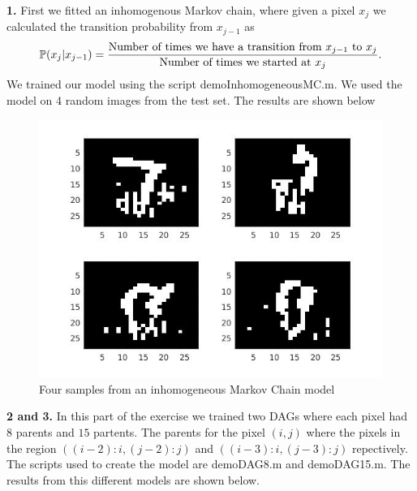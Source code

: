 \documentclass{article}
\begin{document}
\textbf{1.}
\newline
First we fitted an inhomogenous Markov chain, where given a pixel $x_{j}$ we calculated the transition probability from $x_{j-1}$ as
\begin{equation*}
\mathbb{P}(x_{j}|x_{j-1})=\frac{\text{Number of times we have a transition from $x_{j-1}$ to $x_{j}$}}{\text{Number of times we started at $x_{j}$}}.
\end{equation*}
We trained our model using the script demoInhomogeneousMC.m. We used the model on 4 random images from the test set. The results
are shown below
\begin{figure}[h]
\centering
\includegraphics[scale=0.5]{inhomogeneousMC}
\caption{Four samples from an inhomogeneous Markov Chain model}
\end{figure}

\textbf{2 and 3.}
\newline
In this part of the exercise we trained two DAGs where each pixel had $8$ parents and $15$ partents. The parents for the
pixel $(i,j)$ where the pixels in the region $((i-2):i,(j-2):j)$ and $((i-3):i,(j-3):j)$ repectively. The scripts
used to create the model are demoDAG8.m and demoDAG15.m. The results from this different models are shown below.
\end{document}
